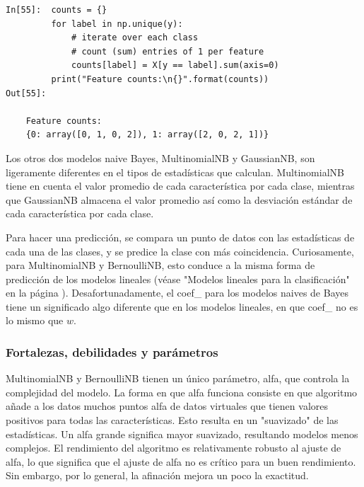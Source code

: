 {\begin{lstlisting}
In[55]:  counts = {}
         for label in np.unique(y):
             # iterate over each class
             # count (sum) entries of 1 per feature
             counts[label] = X[y == label].sum(axis=0)
         print("Feature counts:\n{}".format(counts))
Out[55]:

    Feature counts:
    {0: array([0, 1, 0, 2]), 1: array([2, 0, 2, 1])}

\end{lstlisting}
		

\noindent Los otros dos modelos naive Bayes, MultinomialNB y GaussianNB, son ligeramente diferentes en el tipos de estadísticas que  calculan.  MultinomialNB tiene en cuenta el valor promedio de cada característica por cada clase, mientras que GaussianNB almacena el valor promedio así como la desviación estándar de cada característica por cada clase.


Para hacer una predicción, se compara un punto de datos con las estadísticas de cada una de las clases,
y se predice la clase con más coincidencia.
 Curiosamente, para MultinomialNB y BernoulliNB, esto conduce a la misma  forma de predicción de los modelos lineales  (véase "Modelos lineales para la clasificación"{} en la página \pageref{Mlineales}).
Desafortunadamente, el {\ttfamily coef\_} para los modelos naives de Bayes   tiene un significado algo diferente que en los modelos lineales, en que {\ttfamily coef\_}  no es lo mismo que $w$.

\subsubsection{Fortalezas, debilidades y parámetros} 

 MultinomialNB y BernoulliNB tienen un único parámetro, {\ttfamily alfa}, que controla la complejidad del modelo. 
 La forma en que {\ttfamily alfa}  funciona consiste en que algoritmo añade a los datos  muchos puntos {\ttfamily alfa} de datos virtuales que tienen valores positivos para todas las características.  Esto resulta en un "suavizado"{}  de las estadísticas. Un {\ttfamily alfa} grande significa mayor suavizado, resultando  modelos menos complejos. El rendimiento del algoritmo es relativamente robusto al ajuste de {\ttfamily alfa}, lo que significa que el ajuste de {\ttfamily alfa} no es crítico para un buen rendimiento.  Sin embargo, por lo general, la afinación mejora un poco la exactitud.\\
 
}
